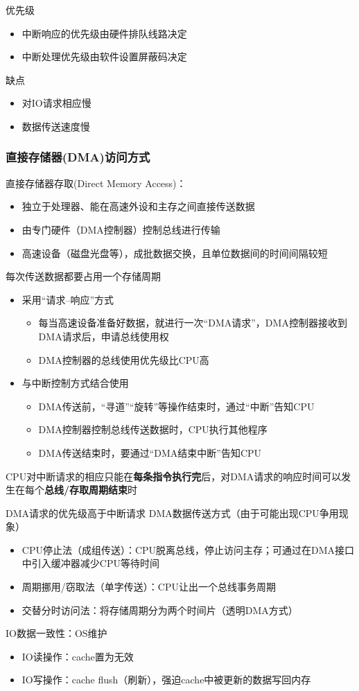 优先级
\begin{itemize}
	\item 中断响应的优先级由硬件排队线路决定
	\item 中断处理优先级由软件设置屏蔽码决定
\end{itemize}
缺点
\begin{itemize}
	\item 对IO请求相应慢
	\item 数据传送速度慢
\end{itemize}

\subsubsection{直接存储器(DMA)访问方式}
直接存储器存取(Direct Memory Access)：
\begin{itemize}
	\item 独立于处理器、能在高速外设和主存之间直接传送数据
	\item 由专门硬件（DMA控制器）控制总线进行传输
	\item 高速设备（磁盘光盘等），成批数据交换，且单位数据间的时间间隔较短
\end{itemize}
\par 每次传送数据都要占用一个存储周期
\begin{itemize}
\item 采用“请求--响应”方式
\begin{itemize}
	\item 每当高速设备准备好数据，就进行一次“DMA请求”，DMA控制器接收到DMA请求后，申请总线使用权
	\item DMA控制器的总线使用优先级比CPU高
\end{itemize}
\item 与中断控制方式结合使用
\begin{itemize}
	\item DMA传送前，“寻道”“旋转”等操作结束时，通过“中断”告知CPU
	\item DMA控制器控制总线传送数据时，CPU执行其他程序
	\item DMA传送结束时，要通过“DMA结束中断”告知CPU
\end{itemize}
\end{itemize}
\par CPU对中断请求的相应只能在\textbf{每条指令执行完}后，对DMA请求的响应时间可以发生在每个\textbf{总线/存取周期结束}时
\par DMA请求的优先级高于中断请求
DMA数据传送方式（由于可能出现CPU争用现象）
\begin{itemize}
	\item CPU停止法（成组传送）：CPU脱离总线，停止访问主存；可通过在DMA接口中引入缓冲器减少CPU等待时间
	\item 周期挪用/窃取法（单字传送）：CPU让出一个总线事务周期
	\item 交替分时访问法：将存储周期分为两个时间片（透明DMA方式）
\end{itemize}
IO数据一致性：OS维护
\begin{itemize}
	\item IO读操作：cache置为无效
	\item IO写操作：cache flush（刷新），强迫cache中被更新的数据写回内存
\end{itemize}

